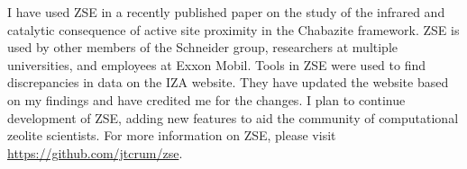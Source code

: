 \documentclass[11pt]{article}
\begin{document}
I have used ZSE in a recently published paper on the study of the infrared and catalytic consequence of active site proximity in the Chabazite framework. \cite{kester-2021-effec-broen} ZSE is used by other members of the Schneider group, researchers at multiple universities, and employees at Exxon Mobil. Tools in ZSE were used to find discrepancies in data on the IZA website. They have updated the website based on my findings and have credited me for the changes. I plan to continue development of ZSE, adding new features to aid the community of computational zeolite scientists. For more information on ZSE, please visit \url{https://github.com/jtcrum/zse}.



\end{document}

